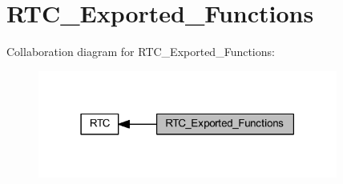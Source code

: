 \hypertarget{group___r_t_c___exported___functions}{}\section{R\+T\+C\+\_\+\+Exported\+\_\+\+Functions}
\label{group___r_t_c___exported___functions}
Collaboration diagram for R\+T\+C\+\_\+\+Exported\+\_\+\+Functions\+:
\nopagebreak
\begin{figure}[H]
\begin{center}
\leavevmode
\includegraphics[width=279pt]{group___r_t_c___exported___functions}
\end{center}
\end{figure}

